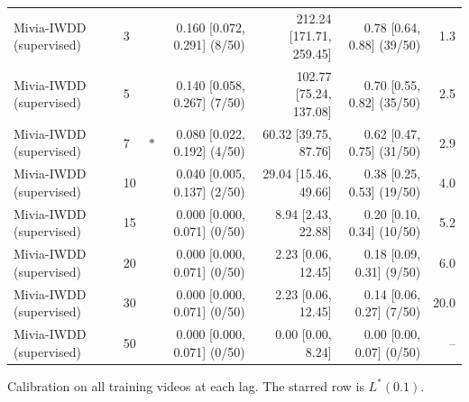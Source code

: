 \begin{table}[t]
{\begin{tabular}{llcrrrr}
Mivia-IWDD (supervised) & 3 &  & 0.160 [0.072, 0.291] (8/50) & 212.24 [171.71, 259.45] & 0.78 [0.64, 0.88] (39/50) & 1.3 \\
Mivia-IWDD (supervised) & 5 &  & 0.140 [0.058, 0.267] (7/50) & 102.77 [75.24, 137.08] & 0.70 [0.55, 0.82] (35/50) & 2.5 \\
Mivia-IWDD (supervised) & 7 & $\ast$ & 0.080 [0.022, 0.192] (4/50) & 60.32 [39.75, 87.76] & 0.62 [0.47, 0.75] (31/50) & 2.9 \\
Mivia-IWDD (supervised) & 10 &  & 0.040 [0.005, 0.137] (2/50) & 29.04 [15.46, 49.66] & 0.38 [0.25, 0.53] (19/50) & 4.0 \\
Mivia-IWDD (supervised) & 15 &  & 0.000 [0.000, 0.071] (0/50) & 8.94 [2.43, 22.88] & 0.20 [0.10, 0.34] (10/50) & 5.2 \\
Mivia-IWDD (supervised) & 20 &  & 0.000 [0.000, 0.071] (0/50) & 2.23 [0.06, 12.45] & 0.18 [0.09, 0.31] (9/50) & 6.0 \\
Mivia-IWDD (supervised) & 30 &  & 0.000 [0.000, 0.071] (0/50) & 2.23 [0.06, 12.45] & 0.14 [0.06, 0.27] (7/50) & 20.0 \\
Mivia-IWDD (supervised) & 50 &  & 0.000 [0.000, 0.071] (0/50) & 0.00 [0.00, 8.24] & 0.00 [0.00, 0.07] (0/50) & -- \\
\bottomrule
\end{tabular}}
\begin{minipage}{\linewidth}\vspace{2pt}\footnotesize Calibration on all training videos at each lag. The starred row is $L^\ast(0.1)$.\end{minipage}
\end{table}
